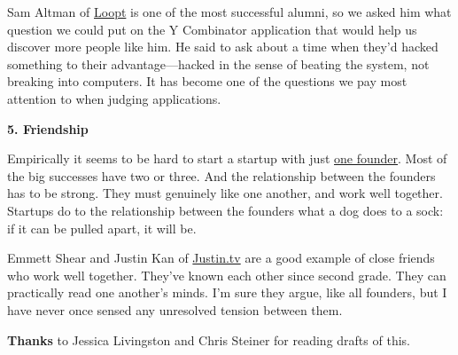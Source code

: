 Sam Altman of
                    \href{http://loopt.com}{Loopt} is one of the most
                    successful alumni, so we asked him what question we could
                    put on the Y Combinator application that would help us
                    discover more people like him. He said to ask about a time
                    when they'd hacked something to their advantage---hacked
                    in the sense of beating the system, not breaking into
                    computers. It has become one of the questions we pay most
                    attention to when judging applications.


                    \textbf{5. Friendship}

Empirically it seems to be
                    hard to start a startup with just
                    \href{http://www.paulgraham.com/startupmistakes.html}{one founder}. Most of the
                    big successes have two or three. And the relationship
                    between the founders has to be strong. They must genuinely
                    like one another, and work well together. Startups do to the
                    relationship between the founders what a dog does to a sock:
                    if it can be pulled apart, it will be.

Emmett
                    Shear and Justin Kan of
                    \href{http://justin.tv}{Justin.tv} are a good example
                    of close friends who work well together. They've known each
                    other since second grade. They can practically read one
                    another's minds. I'm sure they argue, like all founders, but
                    I have never once sensed any unresolved tension between
                    them.







\textbf{Thanks}
                    to Jessica Livingston and Chris Steiner for reading drafts
                    of this.



              
            
          
            
              
                


                  
              
            
          
